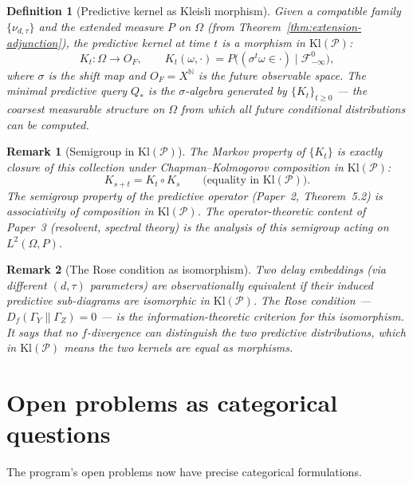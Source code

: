 \documentclass[11pt]{article}
\newtheorem{definition}{Definition}
\newtheorem{remark}{Remark}
\newcommand{\Kl}{\mathrm{Kl}}
\newcommand{\Pcal}{\mathcal{P}}
\newcommand{\Fcal}{\mathcal{F}}
\begin{document}
\begin{definition}[Predictive kernel as Kleisli morphism]
Given a compatible family $\{\nu_{d,\tau}\}$ and the extended measure $P$ on
$\Omega$ (from Theorem~\ref{thm:extension-adjunction}), the \emph{predictive
kernel} at time $t$ is a morphism in $\Kl(\Pcal)$:
\[
  K_t : \Omega \to O_F, \qquad
  K_t(\omega, \cdot) = P\bigl((\sigma^t \omega \in \cdot) \mid \Fcal_{-\infty}^0\bigr),
\]
where $\sigma$ is the shift map and $O_F = X^{\mathbb{N}}$ is the future
observable space.  The \emph{minimal predictive query} $Q_*$ is the
$\sigma$-algebra generated by $\{K_t\}_{t \geq 0}$ --- the coarsest
measurable structure on $\Omega$ from which all future conditional
distributions can be computed.
\end{definition}

\begin{remark}[Semigroup in $\Kl(\Pcal)$]
The Markov property of $\{K_t\}$ is exactly closure of this collection under
Chapman--Kolmogorov composition in $\Kl(\Pcal)$:
\[
  K_{s+t} = K_t \circ K_s \qquad \text{(equality in } \Kl(\Pcal)\text{)}.
\]
The semigroup property of the predictive operator (Paper~2, Theorem~5.2) is
associativity of composition in $\Kl(\Pcal)$.  The operator-theoretic content
of Paper~3 (resolvent, spectral theory) is the analysis of this semigroup
acting on $L^2(\Omega, P)$.
\end{remark}

\begin{remark}[The Rose condition as isomorphism]
Two delay embeddings (via different $(d, \tau)$ parameters) are
\emph{observationally equivalent} if their induced predictive sub-diagrams
are isomorphic in $\Kl(\Pcal)$.  The Rose condition --- $D_f(\Gamma_Y \| \Gamma_Z) = 0$
--- is the information-theoretic criterion for this isomorphism.  It says that
no $f$-divergence can distinguish the two predictive distributions, which in
$\Kl(\Pcal)$ means the two kernels are equal as morphisms.
\end{remark}

\section{Open problems as categorical questions}
\label{sec:open}

The program's open problems now have precise categorical formulations.
\end{document}
